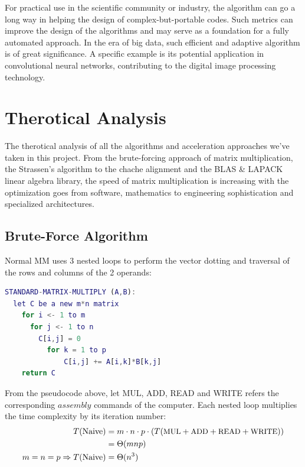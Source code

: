 \documentclass[UTF8]{ctexart}
\begin{document}
For practical use in the scientific community or industry, the algorithm can go a long way in helping the design of complex-but-portable codes. Such metrics can improve the design of the algorithms and may serve as a foundation for a fully automated approach. In the era of big data, such efficient and adaptive algorithm is of great significance. A specific example is its potential application in convolutional neural networks, contributing to the digital image processing technology.
\section{Therotical Analysis}
\label{sec::TA}

The therotical analysis of all the algorithms and acceleration approaches we've taken in this project. From the brute-forcing approach of matrix multiplication, the Strassen's algorithm to the chache alignment and the BLAS \& LAPACK linear algebra library, the speed of matrix multiplication is increasing with the optimization goes from software, mathematics to engineering sophistication and specialized architectures.
\subsection{Brute-Force Algorithm}
\label{subsec::BFA}
Normal MM uses 3 nested loops to perform the vector dotting and traversal of the rows and columns of the 2 operands:
\begin{lstlisting}[language=matlab,style=pseudocode]
  STANDARD-MATRIX-MULTIPLY (A,B):
  let C be a new m*n matrix
    for i <- 1 to m
      for j <- 1 to n
        C[i,j] = 0
          for k = 1 to p
              C[i,j] += A[i,k]*B[k,j]
    return C
\end{lstlisting}
From the pseudocode above, let MUL, ADD, READ and WRITE refers the corresponding \(assembly\) commands of the computer.
Each nested loop multiplies the time complexity by its iteration number:
\begin{equation}
  \begin{aligned}
    T(\text{Naive})                  & =m\cdot n\cdot p\cdot (T(\text{\small MUL}+\text{\small ADD}+\text{\small READ}+\text{\small WRITE})) \\
                                     & =\Theta(mnp)                                                                                          \\
    m=n=p\Rightarrow T(\text{Naive}) & =\Theta(n^{3})
  \end{aligned}
\end{equation}
\end{document}
